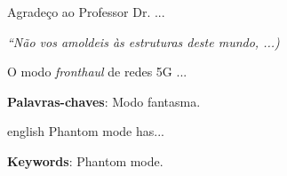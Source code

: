 \documentclass[
	12pt,				%
	openright,			%
	oneside,			%
	a4paper,			%
	english,			%
	brazil				%
	]{abntex2}
\begin{document}
\begin{agradecimentos}
Agradeço ao Professor Dr. ...
\end{agradecimentos}

\begin{epigrafe}
    \vspace*{\fill}
	\begin{flushright}
		\textit{``Não vos amoldeis às estruturas deste mundo, ...)}
	\end{flushright}
\end{epigrafe}


\setlength{\absparsep}{18pt} %
\begin{resumo}
\hspace{1.5cm}O modo \textit{fronthaul} de redes 5G ...
	
 \textbf{Palavras-chaves}: Modo fantasma. 
\end{resumo}

\begin{resumo}[Abstract]
 \begin{otherlanguage*}{english}
\hspace{1.5cm}Phantom mode has...

   \vspace{\onelineskip}
 
   \noindent 
   \textbf{Keywords}: Phantom mode. 
 \end{otherlanguage*}
\end{resumo}


\listoffigures*
\cleardoublepage

\listoftables*
\cleardoublepage
\end{document}
